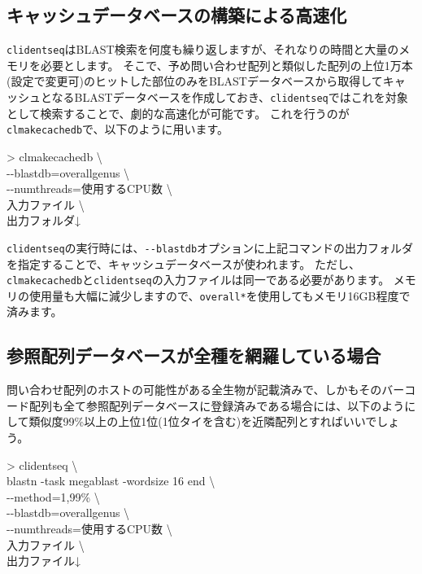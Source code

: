 \documentclass[titlepage,10pt,a4paper]{jsbook}
\newenvironment{cmd}{\begin{oframed}\raggedright\ttfamily\footnotesize\setlength{\baselineskip}{1.4em}}{\end{oframed}\vspace{-1em}}
\begin{document}
\subsection{キャッシュデータベースの構築による高速化}

\texttt{clidentseq}はBLAST検索を何度も繰り返しますが、それなりの時間と大量のメモリを必要とします。
そこで、予め問い合わせ配列と類似した配列の上位1万本(設定で変更可)のヒットした部位のみをBLASTデータベースから取得してキャッシュとなるBLASTデータベースを作成しておき、\texttt{clidentseq}ではこれを対象として検索することで、劇的な高速化が可能です。
これを行うのが\texttt{clmakecachedb}で、以下のように用います。

\begin{cmd}
{\textgreater} clmakecachedb {\textbackslash}\\
{-}{-}blastdb=overall{\textunderscore}genus {\textbackslash}\\
{-}{-}numthreads=使用するCPU数 {\textbackslash}\\
入力ファイル {\textbackslash}\\
出力フォルダ↓
\end{cmd}

\texttt{clidentseq}の実行時には、\texttt{{-}{-}blastdb}オプションに上記コマンドの出力フォルダを指定することで、キャッシュデータベースが使われます。
ただし、\texttt{clmakecachedb}と\texttt{clidentseq}の入力ファイルは同一である必要があります。
メモリの使用量も大幅に減少しますので、\texttt{overall{\textunderscore}*}を使用してもメモリ16GB程度で済みます。

\subsection{参照配列データベースが全種を網羅している場合}\label{subsection:completereferencedatabase}

問い合わせ配列のホストの可能性がある全生物が記載済みで、しかもそのバーコード配列も全て参照配列データベースに登録済みである場合には、以下のようにして類似度99\%以上の上位1位(1位タイを含む)を近隣配列とすればいいでしょう。

\begin{cmd}
{\textgreater} clidentseq {\textbackslash}\\
blastn -task megablast -word{\textunderscore}size 16 end {\textbackslash}\\
{-}{-}method=1,99\% {\textbackslash}\\
{-}{-}blastdb=overall{\textunderscore}genus {\textbackslash}\\
{-}{-}numthreads=使用するCPU数 {\textbackslash}\\
入力ファイル {\textbackslash}\\
出力ファイル↓
\end{cmd}
\end{document}
